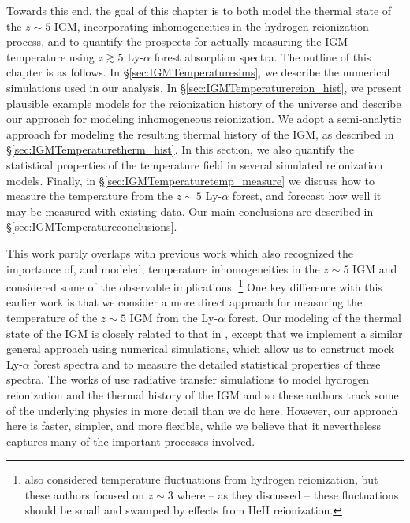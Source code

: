 Towards this end, the goal of this chapter is to both model the thermal state of the $z \sim 5$ IGM, incorporating inhomogeneities in
the hydrogen reionization process, and to quantify the prospects for actually measuring the IGM temperature using $z \gtrsim 5$ Ly-$\alpha$ forest absorption spectra. The outline of this chapter is as follows. In \S \ref{sec:IGMTemperaturesims}, we describe
the numerical simulations used in our analysis. In \S \ref{sec:IGMTemperaturereion_hist}, we present plausible example models for
the reionization history of the universe and describe our approach for modeling inhomogeneous reionization. We adopt a semi-analytic approach
for modeling the resulting thermal history of the IGM, as described in \S \ref{sec:IGMTemperaturetherm_hist}. In this section, we also quantify
the statistical properties of the temperature field in several simulated reionization models.
 Finally, in \S \ref{sec:IGMTemperaturetemp_measure} we discuss how to measure
the temperature from the $z \sim 5$ Ly-$\alpha$ forest, and forecast how well it may be measured with existing data. Our main conclusions
are described in \S \ref{sec:IGMTemperatureconclusions}.

This work partly overlaps with previous work which also recognized the importance of, and modeled, temperature inhomogeneities in the $z \sim 5$ IGM
and considered some of the observable implications \citep{Trac:2008yz,Cen:2009bg,Furlanetto:2009kr}.\footnote{\citet{Lai:2005ha} also considered
temperature fluctuations from hydrogen reionization, but these authors focused on $z \sim 3$ where -- as they discussed -- these fluctuations should be small and swamped
by effects from HeII reionization.} One key difference with this earlier work is
that we consider a more direct approach for measuring the temperature of the $z \sim 5$ IGM from the Ly-$\alpha$ forest. Our modeling of
the thermal state of the IGM is closely related to that in \citet{Furlanetto:2009kr}, except that we implement a similar general approach
using numerical simulations, which allow us to construct mock Ly-$\alpha$ forest spectra and to measure the detailed statistical properties
of these spectra. The works of \citep{Trac:2008yz,Cen:2009bg} use radiative transfer simulations to model hydrogen reionization and the
thermal history of the IGM and so these authors track
some of the underlying physics in more detail than we do here. However, our approach here is faster, simpler, and more flexible, while we believe
that it nevertheless captures many of the important processes involved. 


